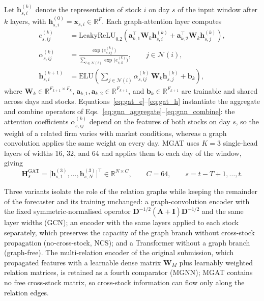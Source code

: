 \documentclass[pdflatex,sn-mathphys-num]{sn-jnl}%
\theoremstyle{thmstyleone}%
\theoremstyle{thmstyletwo}%
\theoremstyle{thmstylethree}%
\begin{document}
{Let $\mathbf{h}^{(k)}_{s,i}$ denote the representation of stock $i$ on day $s$ of the input window after $k$ layers, with $\mathbf{h}^{(0)}_{s,i}=\mathbf{x}_{s,i}\in\mathbb{R}^{F}$. Each graph-attention layer computes
\begin{align}
e^{(k)}_{s,ij}&=\mathrm{LeakyReLU}_{0.2}\!\left(\mathbf{a}_{k,1}^{\top}\mathbf{W}_k\mathbf{h}^{(k)}_{s,i}+\mathbf{a}_{k,2}^{\top}\mathbf{W}_k\mathbf{h}^{(k)}_{s,j}\right),\label{eq:gat_e}\\
\alpha^{(k)}_{s,ij}&=\frac{\exp\big(e^{(k)}_{s,ij}\big)}{\sum_{l\in\mathcal{N}(i)}\exp\big(e^{(k)}_{s,il}\big)},\qquad j\in\mathcal{N}(i),\label{eq:gat_alpha}\\
\mathbf{h}^{(k+1)}_{s,i}&=\mathrm{ELU}\!\left(\sum_{j\in\mathcal{N}(i)}\alpha^{(k)}_{s,ij}\,\mathbf{W}_k\mathbf{h}^{(k)}_{s,j}+\mathbf{b}_k\right),\label{eq:gat_h}
\end{align}
where $\mathbf{W}_k\in\mathbb{R}^{F_{k+1}\times F_k}$, $\mathbf{a}_{k,1},\mathbf{a}_{k,2}\in\mathbb{R}^{F_{k+1}}$, and $\mathbf{b}_k\in\mathbb{R}^{F_{k+1}}$ are trainable and shared across days and stocks. Equations~\eqref{eq:gat_e}--\eqref{eq:gat_h} instantiate the aggregate and combine operators of Eqs.~\eqref{eq:gnn_aggregate}--\eqref{eq:gnn_combine}: the attention coefficients $\alpha^{(k)}_{s,ij}$ depend on the features of both stocks on day $s$, so the weight of a related firm varies with market conditions, whereas a graph convolution applies the same weight on every day. MGAT uses $K=3$ single-head layers of widths 16, 32, and 64 and applies them to each day of the window, giving
\[
\mathbf{H}^{\mathrm{GAT}}_{s}=\big[\mathbf{h}^{(3)}_{s,1},\ldots,\mathbf{h}^{(3)}_{s,N}\big]^{\top}\in\mathbb{R}^{N\times C},\qquad C=64,\qquad s=t-T+1,\ldots,t .
\]

Three variants isolate the role of the relation graphs while keeping the remainder of the forecaster and its training unchanged: a graph-convolution encoder with the fixed symmetric-normalised operator $\mathbf{D}^{-1/2}(\bar{\mathbf{A}}+\mathbf{I})\mathbf{D}^{-1/2}$ and the same layer widths (GCN); an encoder with the same layers applied to each stock separately, which preserves the capacity of the graph branch without cross-stock propagation (no-cross-stock, NCS); and a Transformer without a graph branch (graph-free). The multi-relation encoder of the original submission, which propagated features with a learnable dense matrix $\mathbf{W}_M$ plus learnably weighted relation matrices, is retained as a fourth comparator (MGNN); MGAT contains no free cross-stock matrix, so cross-stock information can flow only along the relation edges.\par}
\end{document}
